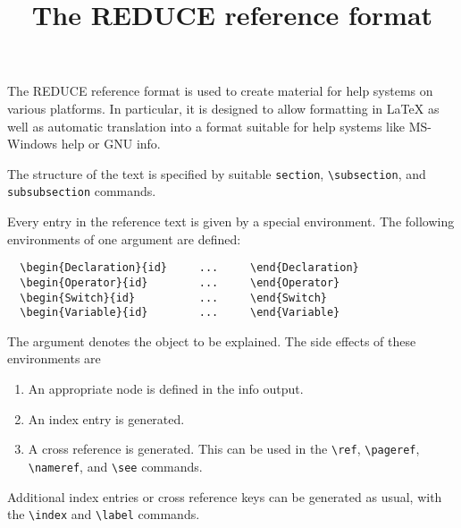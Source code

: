 
\title{The REDUCE reference format}




The REDUCE reference format is used to create material for help systems on
various platforms.  In particular, it is designed to allow formatting in
\LaTeX{} as well as automatic translation into a format suitable for
help systems like MS-Windows help or GNU info.

The structure of the text is specified by suitable \verb|section|,
\verb|\subsection|, and \verb|subsubsection| commands.

Every entry in the reference text is given by a special environment.
The following environments of one argument are defined:
\begin{verbatim}
  \begin{Declaration}{id}     ...     \end{Declaration}
  \begin{Operator}{id}        ...     \end{Operator}
  \begin{Switch}{id}          ...     \end{Switch}
  \begin{Variable}{id}        ...     \end{Variable}
\end{verbatim}
The argument denotes the object to be explained. The side effects of
these environments are
\begin{enumerate}
  \item An appropriate node is defined in the info output.
  \item An index entry is generated.
  \item A cross reference is generated. This can be used in the
        \verb|\ref|, \verb|\pageref|, \verb|\nameref|, and \verb|\see|
        commands.
\end{enumerate}
Additional index entries or cross reference keys can be generated as usual,
with the \verb|\index| and \verb|\label| commands.

